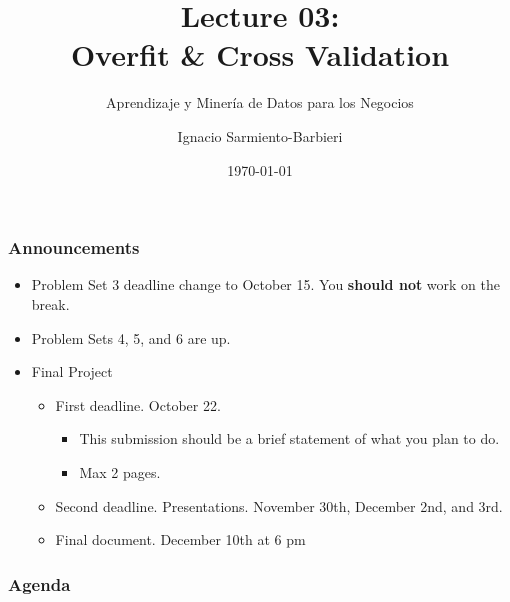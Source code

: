 \documentclass[
  shownotes,
  xcolor={svgnames},
  hyperref={colorlinks,citecolor=DarkBlue,linkcolor=DarkRed,urlcolor=DarkBlue}
  , aspectratio=169]{beamer}
\begin{document}
\title[Lecture 03]{Lecture 03: \\ Overfit \& Cross Validation}
\subtitle{Aprendizaje y Minería de Datos para los Negocios}
\date{\today}

\author[Sarmiento-Barbieri]{Ignacio Sarmiento-Barbieri}


\begin{frame}[noframenumbering]
\maketitle
\end{frame}


\begin{frame}
\frametitle{Announcements}

\begin{itemize}
  \item Problem Set 3 deadline change to October 15. You {\bf should not} work on the break.
  \item Problem Sets 4, 5, and 6 are up.
  \item Final Project
  \medskip
  \begin{itemize}
    \item First deadline. October 22. 
    \begin{itemize}
     \item This submission should be a brief statement of what you plan to do. 
     \item Max 2 pages.
     \end{itemize}
     \medskip
    \item  Second deadline. Presentations. November 30th, December 2nd, and 3rd.
      \medskip
    \item  Final document. December 10th at 6 pm
  \end{itemize}

\end{itemize}

\end{frame}


\begin{frame}
\frametitle{Agenda}

\tableofcontents

\end{frame}
\end{document}
